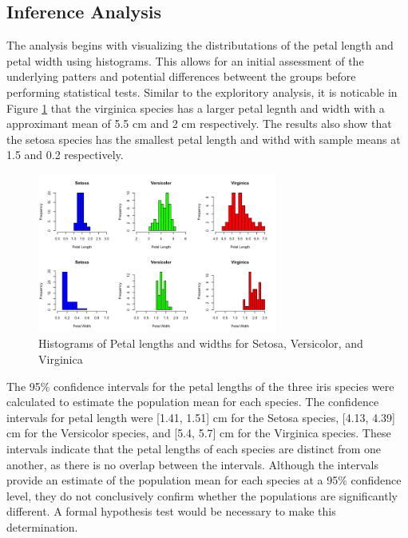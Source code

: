 \documentclass{article}
\begin{document}
\subsection{Inference Analysis}

The analysis begins with visualizing the distributations of the petal length and petal width using histograms. This allows for an initial assessment of the underlying patters and potential differences betweent the groups before performing statistical tests. Similar to the exploritory analysis, it is noticable in Figure \ref {fig:hist_iris} that the virginica species has a larger petal legnth and width with a approximant mean of 5.5 cm and 2 cm respectively. The results also show that the setosa species has the smallest petal length and withd with sample means at 1.5 and 0.2 respectively. 

\begin{figure}[H]
	\centering
	\includegraphics[width=0.7\textwidth]{hist_iris.png}
	\caption{Histograms of Petal lengths and widths for Setosa, Versicolor, and
	Virginica}
	\label{fig:hist_iris}
\end{figure}

The 95\% confidence intervals for the petal lengths of the three iris species were calculated to estimate the population mean for each species. The confidence intervals for petal length were [1.41, 1.51] cm for the Setosa species, [4.13, 4.39] cm for the Versicolor species, and [5.4, 5.7] cm for the Virginica species. These intervals indicate that the petal lengths of each species are distinct from one another, as there is no overlap between the intervals. Although the intervals provide an estimate of the population mean for each species at a 95\% confidence level, they do not conclusively confirm whether the populations are significantly different. A formal hypothesis test would be necessary to make this determination.
\end{document}
